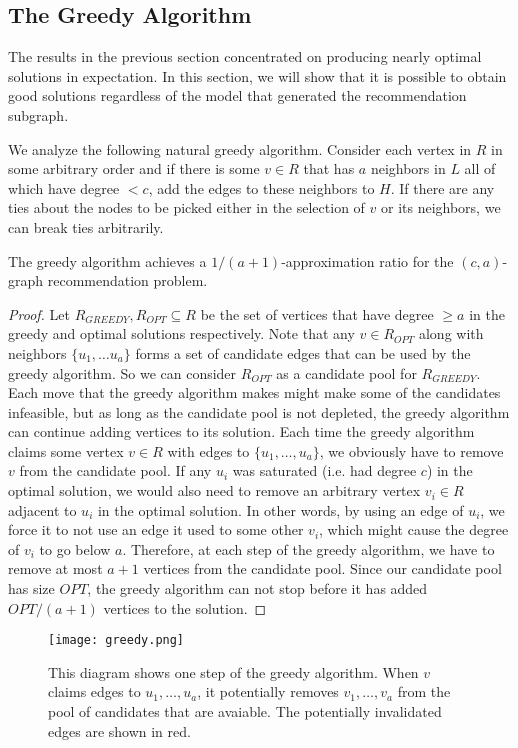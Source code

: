 \subsection{The Greedy Algorithm}
\label{greedy}
The results in the previous section concentrated on producing nearly
optimal solutions in expectation. In this section, we will show that
it is possible to obtain good solutions regardless of the model that
generated the recommendation subgraph. \vs

We analyze the following
natural greedy algorithm. Consider each vertex in $R$ in some
arbitrary order and if there is some $v \in R$ that has $a$ neighbors
in $L$ all of which have degree $< c$, add the edges to these
neighbors to $H$. If there are any ties about the nodes to be picked
either in the selection of $v$ or its neighbors, we can break ties
arbitrarily. 
 
\begin{thm}
The greedy algorithm achieves a $1/(a+1)$-approximation ratio for the $(c,a)$-graph
recommendation problem.
\end{thm}
\begin{proof}
Let $R_{GREEDY}, R_{OPT}\subseteq R$ be the set of vertices that have
degree $\geq a$ in the greedy and optimal solutions respectively. Note
that any $v \in R_{OPT}$ along with neighbors $\{u_1,\ldots u_a\}$
forms a set of candidate edges that can be used by the greedy
algorithm. So we can consider $R_{OPT}$ as a candidate pool for
$R_{GREEDY}$. Each move that the greedy algorithm makes might make
some of the candidates infeasible, but as long as the candidate pool
is not depleted, the greedy algorithm can continue adding vertices to
its solution. Each time the greedy algorithm claims some vertex $v\in
R$ with edges to $\{u_1,\ldots, u_a\}$, we obviously have to
remove $v$ from the candidate pool. If any $u_i$ was saturated
(i.e. had degree $c$) in the optimal solution, we would also need to
remove an arbitrary vertex $v_i\in R$ adjacent to $u_i$ in the optimal
solution. In other words, by using an edge of $u_i$, we force it to
not use an edge it used to some other $v_i$, which might cause the
degree of $v_i$ to go below $a$. Therefore, at each step of
the greedy algorithm, we have to remove at most $a+1$ vertices from
the candidate pool. Since our candidate pool has size $OPT$, the
greedy algorithm can not stop before it has added $OPT/(a+1)$
vertices to the solution.
\end{proof}

\begin{figure}[h]
\centering
\texttt{[image: greedy.png]}
\begin{minipage}[h]{.8\linewidth}
\caption{This diagram shows one step of the greedy algorithm. When $v$ claims edges to $u_1,\ldots, u_a$, it potentially removes $v_1,\ldots, v_a$ from the pool of candidates that are avaiable. The potentially invalidated edges are shown in red.}
\end{minipage}
\end{figure}

